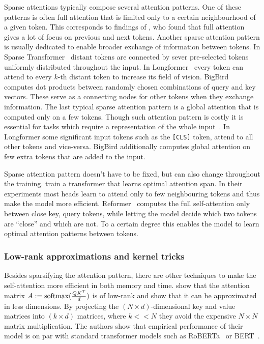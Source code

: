 Sparse attentions typically compose several attention patterns. One of these
patterns is often full attention that is limited only to a certain neighbourhood
of a given token. This corresponds to findings of \cite{clark2019does}, who
found that full attention gives a lot of focus on previous and next tokens.
Another sparse attention pattern is usually dedicated to enable broader exchange
of information between tokens. In Sparse Transformer~\citep{child2019generating}
distant tokens are connected by sever pre-selected tokens uniformly distributed
throughout the input. In Longformer~\citep{beltagy2020longformer} every token
can attend to every $k$-th distant token to increase its field of vision.
BigBird~\citep{zaheer2020big} computes dot products between randomly chosen
combinations of query and key vectors. These serve as a connecting nodes for
other tokens when they exchange information. The last typical sparse attention
pattern is a global attention that is computed only on a few tokens. Though such
attention pattern is costly it is essential for tasks which require a
representation of the whole input~\citep{beltagy2020longformer}. In Longformer
some significant input tokens such as the \texttt{[CLS]} token, attend to all
other tokens and vice-versa. BigBird additionally computes global attention on
few extra tokens that are added to the input.

Sparse attention pattern doesn't have to be fixed, but can also change
throughout the training. \cite{sukhbaatar2019adaptive} train a transformer that
learns optimal attention span. In their experiments most heads learn to attend
only to few neighbouring tokens and thus make the model more efficient.
Reformer~\citep{kitaev2020reformer} computes the full self-attention only between
close key, query tokens, while letting the model decide which two tokens are
``close'' and which are not. To a certain degree this enables the model to learn
optimal attention patterns between tokens.

\subsubsection{Low-rank approximations and kernel tricks}

Besides sparsifying the attention pattern, there are other techniques to make
the self-attention more efficient in both memory and time.
\cite{wang2020linformer} show that the attention matrix $A :=
\operatorname*{\textrm{softmax}}(\frac{QK^T}{d})$ is of low-rank and show that it can be approximated
in less dimensions. By projecting the $(N \times d)$-dimensional key and value
matrices into $(k \times d)$ matrices, where $k << N$ they avoid the expensive
$N\times N$ matrix multiplication. The authors show that empirical performance
of their model is on par with standard transformer models such as
RoBERTa~\citep{liu2019roberta} or BERT~\citep{devlin2019bert}.

